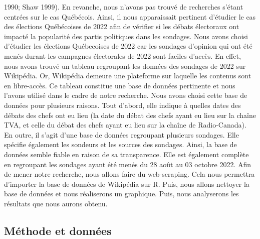 \documentclass[
  letterpaper,
  DIV=11,
  numbers=noendperiod]{scrartcl}
\begin{document}
1990; Shaw 1999). En revanche, nous n'avons pas trouvé de recherches
s'étant centrées sur le cas Québécois. Ainsi, il nous apparaissait
pertinent d'étudier le cas des élections Québécoises de 2022 afin de
vérifier si les débats électoraux ont impacté la popularité des partis
politiques dans les sondages. Nous avons choisi d'étudier les élections
Québecoises de 2022 car les sondages d'opinion qui ont été menés durant
les campagnes électorales de 2022 sont faciles d'accès. En effet, nous
avons trouvé un tableau regroupant les données des sondages de 2022 sur
Wikipédia. Or, Wikipédia demeure une plateforme sur laquelle les
contenus sont en libre-accès. Ce tableau constitue une base de données
pertinente et nous l'avons utilisé dans le cadre de notre recherche.
Nous avons choisi cette base de données pour plusieurs raisons. Tout
d'abord, elle indique à quelles dates des débats des chefs ont eu lieu
(la date du débat des chefs ayant eu lieu sur la chaîne TVA, et celle du
débat des chefs ayant eu lieu sur la chaîne de Radio-Canada). En outre,
il s'agit d'une base de données regroupant plusieurs sondages. Elle
spécifie également les sondeurs et les sources des sondages. Ainsi, la
base de données semble fiable en raison de sa transparence. Elle est
également complète en regroupant les sondages ayant été menés du 28 août
au 03 octobre 2022. Afin de mener notre recherche, nous allons faire du
web-scraping. Cela nous permettra d'importer la base de données de
Wikipédia sur R. Puis, nous allons nettoyer la base de données et nous
réaliserons un graphique. Puis, nous analyserons les résultats que nous
aurons obtenu.

\hypertarget{muxe9thode-et-donnuxe9es}{%
\subsection{Méthode et données}\label{muxe9thode-et-donnuxe9es}}
\end{document}
